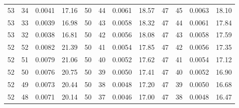 \begin{tabular}{llll|llll|llll}
53 & 34 & 0.0041 & 17.16 & 50 & 44 & 0.0061 & 18.57 & 47 & 45 & 0.0063 & 18.10\\
53 & 33 & 0.0039 & 16.98 & 50 & 43 & 0.0058 & 18.32 & 47 & 44 & 0.0061 & 17.84\\
53 & 32 & 0.0038 & 16.81 & 50 & 42 & 0.0056 & 18.08 & 47 & 43 & 0.0058 & 17.59\\
52 & 52 & 0.0082 & 21.39 & 50 & 41 & 0.0054 & 17.85 & 47 & 42 & 0.0056 & 17.35\\
52 & 51 & 0.0079 & 21.06 & 50 & 40 & 0.0052 & 17.62 & 47 & 41 & 0.0054 & 17.12\\
52 & 50 & 0.0076 & 20.75 & 50 & 39 & 0.0050 & 17.41 & 47 & 40 & 0.0052 & 16.90\\
52 & 49 & 0.0073 & 20.44 & 50 & 38 & 0.0048 & 17.20 & 47 & 39 & 0.0050 & 16.68\\
52 & 48 & 0.0071 & 20.14 & 50 & 37 & 0.0046 & 17.00 & 47 & 38 & 0.0048 & 16.47\\
\bottomrule
\end{tabular}
\newpage
